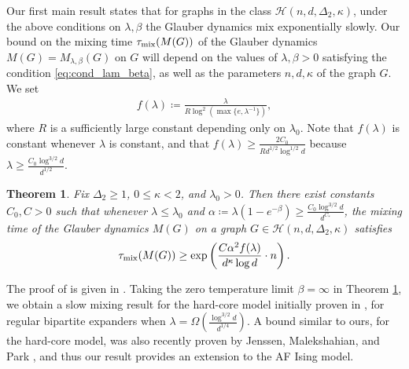\documentclass[reqno,a4paper,11pt]{amsart}
\newtheorem{theorem}{Theorem}[section]
\newcommand{\cH}{\mathcal{H}}
\newcommand{\lam}{\lambda}
\newcommand{\tmix}{\tau_{\rm{mix}}}
\newcommand{\ex}{\kappa}
\newcommand{\exx}{C_*}
\newcommand{\codeg}{\Delta_2}
\begin{document}
Our first main result states that for graphs in the class $\cH(n, d, \codeg, \ex)$, under the above conditions on $\lam, \beta$ the Glauber dynamics mix exponentially slowly.
Our bound on the mixing time $\tmix(M(G))$ of the Glauber dynamics $M(G) = M_{\lam,\beta}(G)$ on $G$ will depend on the values of $\lam, \beta > 0$ satisfying the condition \eqref{eq:cond_lam_beta}, as well as the parameters $n, d, \ex$ of the graph $G$. We set
\begin{align} \label{eq:def-flambda}
    f(\lam) \coloneqq \frac{\lam}{R \log^2 (\max\{e, \lam^{-1}\})},
\end{align}
where $R$ is a sufficiently large constant depending only on $\lam_0$. Note that $f(\lam)$ is constant whenever $\lam$ is constant, and that $f(\lam) \geq \frac{2C_0}{R d^{1/2} \log^{1/2} d}$ because $\lam \geq \frac{C_0 \log^{3/2} d}{d^{1/2}}$.
\begin{theorem} \label{thm:slowmixing}
    Fix $\codeg \ge 1$, $0 \le \ex < 2$, and $\lam_0>0$. Then there exist constants $C_0, C > 0$ such that whenever $\lambda \le \lam_0$ and $\alpha \coloneqq \lam(1 - e^{-\beta}) \ge \frac{C_0 \log^{3/2} d}{d^{\exx}}$, the mixing time of the Glauber dynamics $M(G)$ on a graph $G \in \cH(n,d,\codeg,\ex)$ satisfies
    \[
    \tmix(M(G)) \geq \exp\left( \frac{C \alpha^2 f(\lam)}{d^{\ex} \log d} \cdot n\right).
    \]
\end{theorem}

The proof of  is given in . Taking the zero temperature limit $\beta = \infty$ in Theorem \ref{thm:slowmixing}, we obtain a slow mixing result for the hard-core model initially proven in \cite{GaTe2006}, for regular bipartite expanders when $\lam = {\Omega}\left(\frac{\log^{3/2} d}{d^{1/4}}\right)$. A bound similar to ours, for the hard-core model, was also recently proven by Jenssen, Malekshahian, and Park \cite{jenssen2024refined}, and thus our result provides an extension to the AF Ising model.
\end{document}
